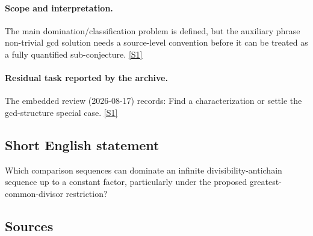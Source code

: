 \documentclass[11pt,a4paper]{article}
\newcommand{\sref}[2]{\hyperlink{source:#1:#2}{[S#2]}}
\begin{document}
\paragraph{Scope and interpretation.}

The main domination/classification problem is defined, but the auxiliary phrase non-trivial gcd solution needs a source-level convention before it can be treated as a fully quantified sub-conjecture. \sref{2371}{1}

\paragraph{Residual task reported by the archive.}

The embedded review (2026-08-17) records: Find a characterization or settle the gcd-structure special case. \sref{2371}{1}

\subsection{Short English statement}

Which comparison sequences can dominate an infinite divisibility-antichain sequence up to a constant factor, particularly under the proposed greatest-common-divisor restriction?

\subsection{Sources}
\end{document}

